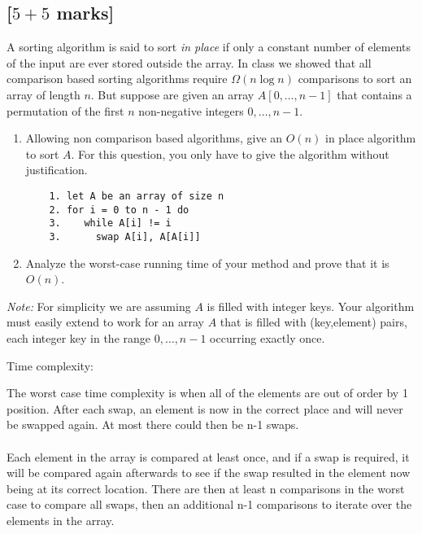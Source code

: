 \documentclass[12pt]{article}
\begin{document}
\subsection{[$5 + 5$ marks]}

A sorting algorithm is said to sort \emph{in place} if only a constant
number of elements of the input are ever stored outside the array. In class we
showed that all comparison based sorting algorithms require $\Omega (n \log
n)$ comparisons to sort an array of length $n$. But suppose are given an array
$A [0, \ldots, n - 1]$ that contains a permutation of the first $n$
non-negative integers $0,\dots,n-1$.
\begin{enumerate}
  \item Allowing non comparison based algorithms, give an $O (n)$ in place
  algorithm to sort $A$. For this question, you only have to give the
  algorithm without justification.

  \begin{verbatim}
    1. let A be an array of size n
    2. for i = 0 to n - 1 do 
    3.    while A[i] != i
    3.      swap A[i], A[A[i]]
  \end{verbatim}
  
  \item Analyze the worst-case running time of your method and prove that it
  is $O (n)$. 

\end{enumerate}
\emph{Note:} For simplicity we are assuming $A$ is filled with integer
keys. Your algorithm must easily extend to work for an array $A$ that is
filled with (key,element) pairs, each integer key in the range 
$0, \ldots, n - 1$ occurring exactly once.

Time complexity:

  The worst case time complexity is when all of the elements are out of order by 1 position. After each swap, an element is now in the correct place and will never be swapped again. At most there could then be n-1 swaps.\\\\

  Each element in the array is compared at least once, and if a swap is required, it will be compared again afterwards to see if the swap resulted in the element now being at its correct location. There are then at least n comparisons in the worst case to compare all swaps, then an additional n-1 comparisons to iterate over the elements in the array.
\end{document}
